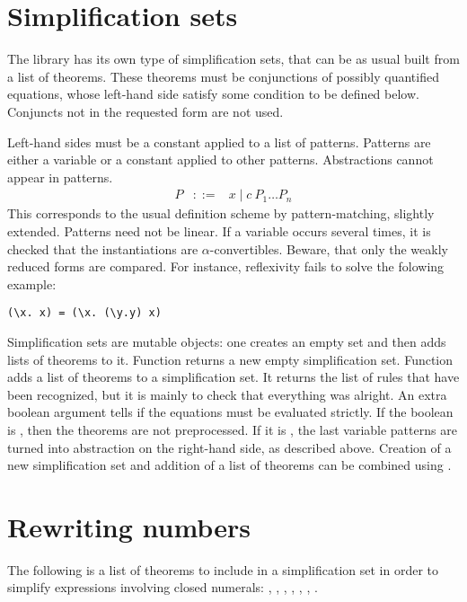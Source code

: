 \section{Simplification sets}

The  library has its own type of simplification sets, that
can be as usual built from a list of theorems. These theorems must be
conjunctions of possibly quantified equations, whose left-hand side
satisfy some condition to be defined below. Conjuncts not in the
requested form are not used.

Left-hand sides must be a constant applied to a list of
patterns. Patterns are either a variable or a constant applied to
other patterns. Abstractions cannot appear in patterns.
\begin{eqnarray*}
P & ::= & x \mid c~P_1 \ldots P_n
\end{eqnarray*}
This corresponds to the usual definition scheme by pattern-matching,
slightly extended. Patterns need not be linear. If a variable occurs
several times, it is checked that the instantiations are
$\alpha$-convertibles. Beware, that only the weakly reduced forms are
compared. For instance, reflexivity fails to solve the folowing example:
\begin{verbatim}
(\x. x) = (\x. (\y.y) x)
\end{verbatim}


Simplification sets are mutable objects: one creates an empty set and
then adds lists of theorems to it. Function  returns a
new empty simplification set. Function  adds a list
of theorems to a simplification set. It returns the list of rules that
have been recognized, but it is mainly to check that everything was
alright. An extra boolean argument tells if the equations must be
evaluated strictly. If the boolean is , then the theorems are
not preprocessed. If it is , the last variable patterns are
turned into abstraction on the right-hand side, as described above.
Creation of a new simplification set and addition of a list of
theorems can be combined using .

\section{Rewriting numbers}

The following is a list of theorems to include in a simplification set
in order to simplify expressions involving closed numerals:
, , ,
, , ,
.
